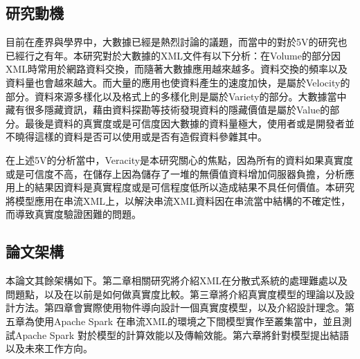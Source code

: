 \subsection{研究動機}
目前在產界與學界中，大數據已經是熱烈討論的議題，而當中的對於5V的研究也已經行之有年。本研究對於大數據的XML文件有以下分析：在Volume的部分因XML時常用於網路資料交換，而隨著大數據應用越來越多。資料交換的頻率以及資料量也會越來越大。而大量的應用也使資料產生的速度加快，是屬於Velocity的部分。資料來源多樣化以及格式上的多樣化則是屬於Variety的部分。大數據當中藏有很多隱藏資訊，藉由資料探勘等技術發現資料的隱藏價值是屬於Value的部分。最後是資料的真實度或是可信度因大數據的資料量極大，使用者或是開發者並不曉得這樣的資料是否可以使用或是否有造假資料參雜其中。\\\par

在上述5V的分析當中，Veracity是本研究關心的焦點，因為所有的資料如果真實度或是可信度不高，在儲存上因為儲存了一堆的無價值資料增加伺服器負擔，分析應用上的結果因資料是真實程度或是可信程度低所以造成結果不具任何價值。本研究將模型應用在串流XML上，以解決串流XML資料因在串流當中結構的不確定性，而導致真實度驗證困難的問題。

\subsection{論文架構}
本論文其餘架構如下。第二章相關研究將介紹XML在分散式系統的處理難處以及問題點，以及在以前是如何做真實度比較。第三章將介紹真實度模型的理論以及設計方法。第四章會實際使用物件導向設計一個真實度模型，以及介紹設計理念。第五章為使用Apache Spark 在串流XML的環境之下間模型實作至叢集當中，並且測試Apache Spark 對於模型的計算效能以及傳輸效能。第六章將針對模型提出結語以及未來工作方向。
